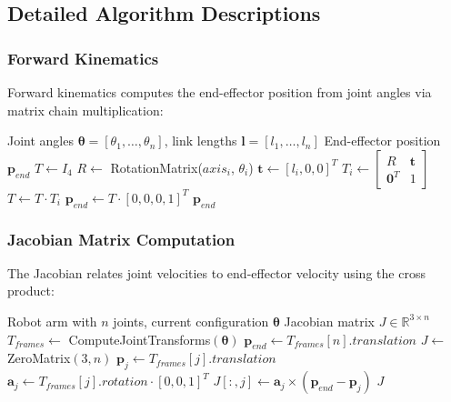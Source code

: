 \documentclass[11pt]{article}
\begin{document}
\subsection{Detailed Algorithm Descriptions}

\subsubsection{Forward Kinematics}

Forward kinematics computes the end-effector position from joint angles via matrix chain multiplication:

\begin{algorithm}[H]
\caption{Forward Kinematics}
\begin{algorithmic}[1]
\Require Joint angles $\boldsymbol{\theta} = [\theta_1, \ldots, \theta_n]$, link lengths $\mathbf{l} = [l_1, \ldots, l_n]$
\Ensure End-effector position $\mathbf{p}_{end}$
\State $T \gets I_4$ 
    \State $R \gets$ RotationMatrix($axis_i$, $\theta_i$) 
    \State $\mathbf{t} \gets [l_i, 0, 0]^T$ 
    \State $T_i \gets \begin{bmatrix} R & \mathbf{t} \\ \mathbf{0}^T & 1 \end{bmatrix}$ 
    \State $T \gets T \cdot T_i$ 
\EndFor
\State $\mathbf{p}_{end} \gets T \cdot [0, 0, 0, 1]^T$ 
\State \Return $\mathbf{p}_{end}$
\end{algorithmic}
\end{algorithm}

\subsubsection{Jacobian Matrix Computation}

The Jacobian relates joint velocities to end-effector velocity using the cross product:

\begin{algorithm}[H]
\caption{Compute Jacobian Matrix}
\begin{algorithmic}[1]
\Require Robot arm with $n$ joints, current configuration $\boldsymbol{\theta}$
\Ensure Jacobian matrix $J \in \mathbb{R}^{3 \times n}$
\State $T_{frames} \gets$ ComputeJointTransforms$(\boldsymbol{\theta})$ 
\State $\mathbf{p}_{end} \gets T_{frames}[n].translation$
\State $J \gets$ ZeroMatrix$(3, n)$
    \State $\mathbf{p}_j \gets T_{frames}[j].translation$ 
    \State $\mathbf{a}_j \gets T_{frames}[j].rotation \cdot [0, 0, 1]^T$ 
    \State $J[:, j] \gets \mathbf{a}_j \times (\mathbf{p}_{end} - \mathbf{p}_j)$ 
\EndFor
\State \Return $J$
\end{algorithmic}
\end{algorithm}
\end{document}
